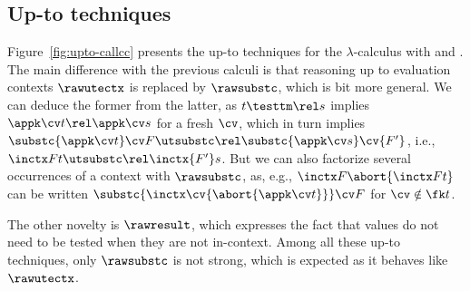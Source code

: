 \documentclass{lmcs}
\theoremstyle{defC}
\begin{document}
\subsection{Up-to techniques} Figure~\ref{fig:upto-callcc} presents the up-to
techniques for the $\lambda$-calculus with \textcallcc and \textabort. The main
difference with the previous calculi is that reasoning up to evaluation
contexts $\rawutectx$ is replaced by $\rawsubstc$, which is bit more general. We
can deduce the former from the latter, as $t \testtm\rel s$ implies
$\appk \cv t \rel \appk \cv s$ for a fresh $\cv$, which in turn implies
$\substc {\appk \cv t} \cv F \utsubstc\rel \substc {\appk \cv s} \cv {F'}$,
i.e., $\inctx F t \utsubstc\rel \inctx {F'} s$. But we can also factorize
several occurrences of a context with $\rawsubstc$, as, e.g.,
$\inctx F {\abort {\inctx F t}}$ can be written
$\substc {\inctx \cv {\abort {\appk \cv t}}} \cv F$ for $\cv \notin \fk t$.

The other novelty is $\rawresult$, which expresses the fact that
values do not need to be tested when they are not in-context. Among
all these up-to techniques, only $\rawsubstc$ is not strong, which is
expected as it behaves like $\rawutectx$.
\end{document}
